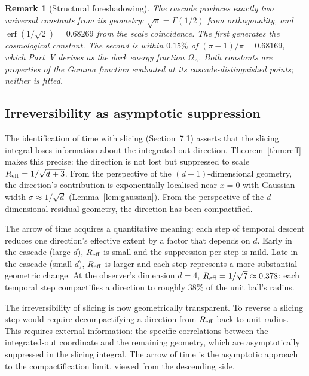 \documentclass[12pt,a4paper]{article}
\newtheorem{remark}[theorem]{Remark}
\begin{document}
\begin{remark}[Structural foreshadowing]
The cascade produces exactly two universal constants from its geometry:
$\sqrt{\pi} = \Gamma(1/2)$ from orthogonality, and $\operatorname{erf}(1/\sqrt{2}) =
0.68269$ from the scale coincidence. The first generates the cosmological constant.
The second is within $0.15\%$ of $(\pi-1)/\pi = 0.68169$, which Part~V derives as the
dark energy fraction $\Omega_\Lambda$. Both constants are properties of the
Gamma function evaluated at its cascade-distinguished points; neither is fitted.
\end{remark}

\subsection{Irreversibility as asymptotic suppression}

The identification of time with slicing (Section~7.1) asserts that the slicing integral
loses information about the integrated-out direction. Theorem~\ref{thm:reff} makes this
precise: the direction is not lost but suppressed to scale $R_{\rm eff}=1/\sqrt{d+3}$.
From the perspective of the $(d+1)$-dimensional geometry, the direction's contribution is
exponentially localised near $x=0$ with Gaussian width $\sigma\approx 1/\sqrt{d}$
(Lemma~\ref{lem:gaussian}). From the perspective of the $d$-dimensional residual geometry,
the direction has been compactified.

The arrow of time acquires a quantitative meaning: each step of temporal descent reduces one
direction's effective extent by a factor that depends on $d$. Early in the cascade (large
$d$), $R_{\rm eff}$ is small and the suppression per step is mild. Late in the cascade
(small $d$), $R_{\rm eff}$ is larger and each step represents a more substantial geometric
change. At the observer's dimension $d=4$, $R_{\rm eff}=1/\sqrt{7}\approx 0.378$: each
temporal step compactifies a direction to roughly 38\% of the unit ball's radius.

The irreversibility of slicing is now geometrically transparent. To reverse a slicing step
would require decompactifying a direction from $R_{\rm eff}$ back to unit radius. This
requires external information: the specific correlations between the integrated-out
coordinate and the remaining geometry, which are asymptotically suppressed in the slicing
integral. The arrow of time is the asymptotic approach to the compactification limit,
viewed from the descending side.
\end{document}
